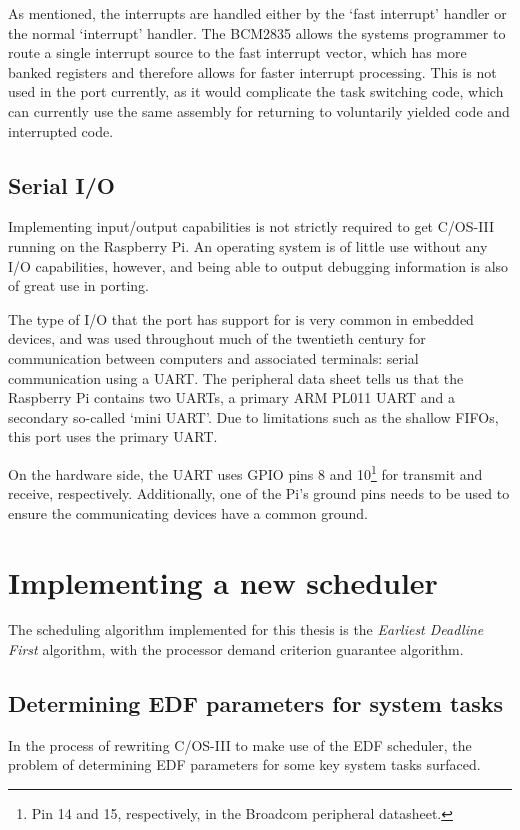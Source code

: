 \documentclass[twoside]{uva-inf-bachelor-thesis}
\newcommand{\ucosiii}{\textmu C/OS-III\xspace}
\begin{document}
As mentioned, the interrupts are handled either by the `fast interrupt' handler or the normal `interrupt' handler. The BCM2835 allows the systems programmer to route a single interrupt source to the fast interrupt vector, which has more banked registers and therefore allows for faster interrupt processing. This is not used in the port currently, as it would complicate the task switching code, which can currently use the same assembly for returning to voluntarily yielded code and interrupted code.

\section{Serial I/O} \label{sec:miniuart}
Implementing input/output capabilities is not strictly required to get \ucosiii running on the Raspberry Pi. An operating system is of little use without any I/O capabilities, however, and being able to output debugging information is also of great use in porting.

The type of I/O that the port has support for is very common in embedded devices, and was used throughout much of the twentieth century for communication between computers and associated terminals: serial communication using a UART. The peripheral data sheet tells us that the Raspberry Pi contains two UARTs, a primary ARM PL011 UART and a secondary so-called `mini UART'. Due to limitations such as the shallow FIFOs, this port uses the primary UART.

On the hardware side, the UART uses GPIO pins 8 and 10\footnote{Pin 14 and 15, respectively, in the Broadcom peripheral datasheet.} for transmit and receive, respectively. Additionally, one of the Pi's ground pins needs to be used to ensure the communicating devices have a common ground.

%
%
%
%

\chapter{Implementing a new scheduler}
The scheduling algorithm implemented for this thesis is the \emph{Earliest Deadline First} algorithm, with the processor demand criterion guarantee algorithm.

\section{Determining EDF parameters for system tasks}
In the process of rewriting \ucosiii to make use of the EDF scheduler, the problem of determining EDF parameters for some key system tasks surfaced.
\end{document}

